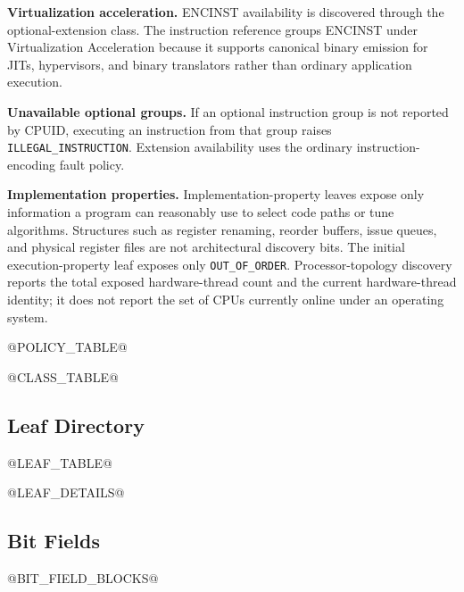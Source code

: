 \noindent\textbf{Virtualization acceleration.} ENCINST availability is discovered through the optional-extension
class. The instruction reference groups ENCINST under Virtualization Acceleration because it supports
canonical binary emission for JITs, hypervisors, and binary translators rather than ordinary application
execution.

\noindent\textbf{Unavailable optional groups.} If an optional instruction group is not reported by CPUID,
executing an instruction from that group raises \texttt{ILLEGAL\_INSTRUCTION}. Extension availability uses the
ordinary instruction-encoding fault policy.

\noindent\textbf{Implementation properties.} Implementation-property leaves expose only information a program can
reasonably use to select code paths or tune algorithms. Structures such as register renaming, reorder buffers,
issue queues, and physical register files are not architectural discovery bits. The initial execution-property
leaf exposes only \texttt{OUT\_OF\_ORDER}. Processor-topology discovery reports the total exposed hardware-thread
count and the current hardware-thread identity; it does not report the set of CPUs currently online under an
operating system.

@POLICY_TABLE@

@CLASS_TABLE@

\subsection{Leaf Directory}
@LEAF_TABLE@

@LEAF_DETAILS@

\subsection{Bit Fields}
@BIT_FIELD_BLOCKS@
